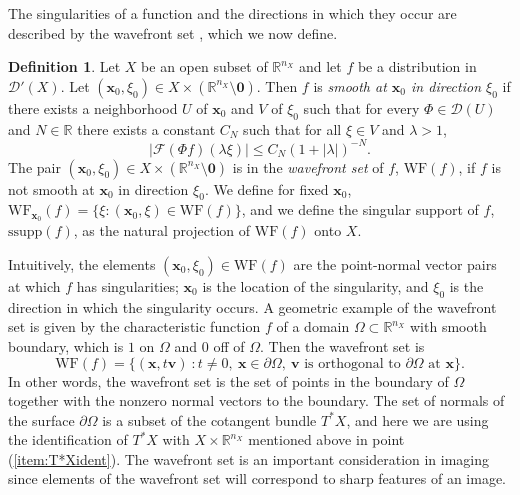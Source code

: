 \documentclass[a4paper,12pt]{amsart}
\numberwithin{equation}{section}
\theoremstyle{plain}
\numberwithin{theorem}{section}
\theoremstyle{definition}
\newtheorem{definition}[theorem]{Definition}
\theoremstyle{remark}
\theoremstyle{remark}
\theoremstyle{remark}
\newcommand{\smo}{\setminus \mathbf{0}}
\newcommand{\abs}[1]{\left|#1\right|}                 %
\newcommand{\Dc}{\mathcal{D}}
\newcommand{\Fc}{\mathcal{F}}
\newcommand{\WF}{\mathrm{WF}}
\newcommand{\wf}{\mathrm{WF}}                         %
\newcommand{\vv}{{\mathbf{v}}}
\newcommand{\vx}{{\mathbf{x}}}
\newcommand{\rr}{{{\mathbb R}}}
\begin{document}
\noindent The singularities of a function and the directions in which they occur
are described by the wavefront set \cite[page
16]{duistermaat1996fourier}, which we now define.
\begin{definition}
\label{WF} Let $X$ be an open subset of $\mathbb{R}^{n_X}$ and let $f$ be a
distribution in $\mathcal{D}'(X)$.  Let $(\vx_0,\xi_0)\in X\times
(\rr^{n_X}\smo)$.  Then $f$ is \emph{smooth at $\vx_0$ in direction $\xi_0$} if
there exists a neighborhood $U$ of $\vx_0$ and $V$ of $\xi_0$ such
that for every $\Phi\in \Dc(U)$ and $N\in\mathbb{R}$ there exists a
constant $C_N$ such that for all $\xi\in V$ {and $\lambda >1$},
\begin{equation}
\left|\Fc(\Phi f)(\lambda\xi)\right|\leq C_N(1+\abs{\lambda})^{-N}.
\end{equation}
The pair $(\vx_0,\xi_0)\in X\times
(\rr^{n_X}\smo)$ is in the \emph{wavefront set} of $f$, $\wf(f)$, if
$f$ is not smooth at $\vx_0$ in direction $\xi_0$. We define for fixed $\vx_0$, $\WF_{\vx_0}(f) = \{\xi : (\vx_0,\xi) \in \WF(f)\}$, and we define the singular support of $f$, $\text{ssupp}(f)$, as the natural projection of $\WF(f)$ onto $X$.
\end{definition}


Intuitively, the elements 
$(\vx_0,\xi_0)\in \WF(f)$ are the point-normal vector pairs at
which $f$ has singularities; $\vx_0$ is the location of the 
  singularity, and  $\xi_0$ is the direction in which the
  singularity occurs.
  A
 geometric example of the wavefront set is given by the characteristic function $f$ of a domain $\Omega \subset \mathbb{R}^{n_X}$ with smooth boundary, which is $1$ on $\Omega$ and $0$ off of $\Omega$. Then the wavefront set is
\[
\WF(f) = \{(\vx,t\vv) \ : t \neq 0, \ \vx \in \partial \Omega, \ \mbox{$\vv$ is orthogonal to $\partial \Omega$ at $\vx$}\}.
\]
In other words, the wavefront set is the set of points in the boundary of $\Omega$ together with the nonzero normal vectors to the boundary. {The set of normals of the surface $\partial \Omega$ is a subset of the cotangent bundle $T^*X$, and here we are using the identification of $T^*X$ with $X \times \mathbb{R}^{n_X}$ mentioned above in point (\ref{item:T*Xident}).} The wavefront set is an important consideration in imaging since elements of the wavefront set will correspond to sharp features of an image.

\end{document}

